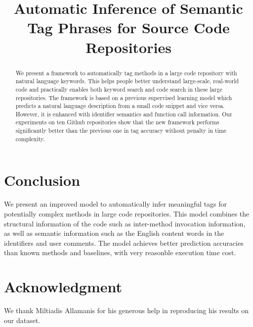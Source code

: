 \documentclass[letterpaper]{article}
\begin{document}
%
\title{Automatic Inference of Semantic Tag Phrases for Source Code Repositories}
\maketitle
\begin{abstract}
We present a framework to automatically tag methods in a large code repository 
with natural language keywords. This helps people better understand large-scale,
real-world code and practically enables both keyword search and code search in
these large repositories.
The framework is based on a previous supervised learning model which predicts
a natural language description from a small code snippet and vice versa. 
However, it is enhanced with identifier semantics and function call 
information. Our experiments on ten Github repositories show that 
the new framework performs significantly better than the previous one 
in tag accuracy without penalty in time complexity.
\end{abstract}







\section{Conclusion}
We present an improved model to automatically infer meaningful tags for
potentially complex methods in large code repositories. This model 
combines the structural information of the code such as inter-method 
invocation information, as well as semantic information such as the English
content words in the identifiers and user comments. The model achieves better
prediction accuracies than known methods and baselines, with very reasonble
execution time cost.

\section*{Acknowledgment}
We thank Miltiadis Allamanis for his generous help in reproducing his
results on our dataset.




\end{document}
